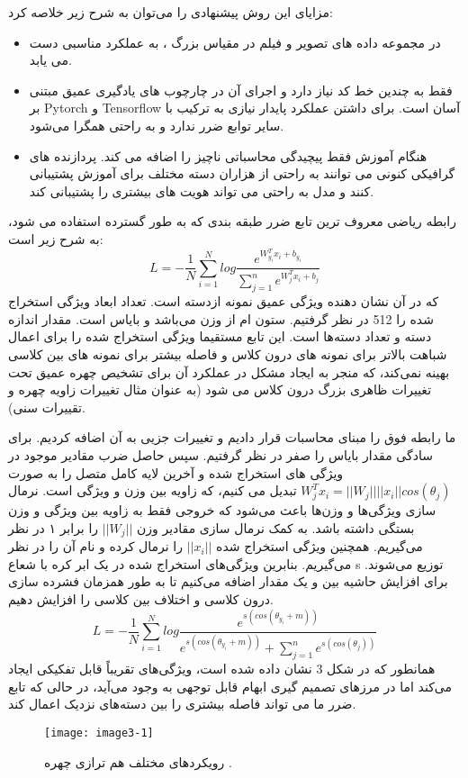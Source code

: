 مزایای این روش پیشنهادی را می‌توان به شرح زیر خلاصه کرد:
\begin{itemize}
 \item
در مجموعه داده های تصویر و فیلم در مقیاس بزرگ ، به عملکرد مناسبی دست می یابد.
 \item
فقط به چندین خط کد نیاز دارد و اجرای آن در چارچوب های یادگیری عمیق مبتنی بر  Pytorch و Tensorflow آسان است. برای داشتن عملکرد پایدار نیازی به ترکیب با سایر توابع ضرر ندارد و به راحتی همگرا می‌شود.
 \item
هنگام آموزش فقط پیچیدگی محاسباتی ناچیز را اضافه می کند. پردازنده های گرافیکی کنونی می توانند به راحتی از هزاران دسته مختلف برای آموزش پشتیبانی کنند و مدل به راحتی می تواند هویت های بیشتری را پشتیبانی کند.
\end{itemize} 
\noindent


رابطه ریاضی  معروف ترین تابع ضرر طبقه بندی که به طور گسترده استفاده می شود، به شرح زیر است:
 \begin{equation}\label{eq3-2}
L= - \frac{1}{N} \sum_{i=1}^{N} log \frac{e^{{W_{y_i}^T} x_i + b_{y_i}}}{\sum_{j=1}^{n} e^{{W_j^T} x_i + b_j}} 
\end{equation}
\noindent
که در آن  نشان دهنده ویژگی عمیق نمونه  ازدسته  است. تعداد ابعاد ویژگی استخراج شده را 512 در نظر گرفتیم.  ستون   ام از وزن  می‌باشد و  بایاس است. مقدار اندازه دسته و  تعداد دسته‌ها است. این تابع مستقیما ویژگی استخراج شده را برای اعمال شباهت بالاتر برای نمونه های درون کلاس و فاصله بیشتر برای نمونه های بین کلاسی بهینه نمی‌کند، که منجر به ایجاد مشکل در عملکرد آن برای تشخیص چهره عمیق تحت تغییرات ظاهری بزرگ درون کلاس می شود (به عنوان مثال تغییرات زاویه چهره و تقییرات سنی).

\noindent
ما رابطه فوق را مبنای محاسبات قرار دادیم و تغییرات جزیی به آن اضافه کردیم. برای سادگی مقدار بایاس را صفر در نظر گرفتیم. سپس حاصل ضرب مقادیر موجود در ویژگی های استخراج شده و آخرین لایه کامل
متصل را به صورت
$W_j^T x_i = ||W_j|| ||x_i|| cos(θ_j)$
تبدیل می کنیم، که  زاویه بین وزن  و ویژگی  است. نرمال سازی ویژگی‌ها و وزن‌ها باعث می‌شود که خروجی فقط به زاویه بین ویژگی و وزن بستگی داشته باشد. به کمک نرمال سازی مقادیر وزن $||W_j||$ را برابر ۱ در نظر می‌گیریم. همچنین ویژگی استخراج شده $||x_i||$ را نرمال کرده و نام آن را  در نظر می‌گیریم. ‌‌‌بنابرین ویژگی‌های استخراج شده در یک ابر کره با شعاع s توزیع می‌شوند. برای افزایش حاشیه بین  و  یک مقدار اضافه می‌کنیم تا به طور همزمان فشرده سازی درون کلاسی و اختلاف بین کلاسی را افزایش دهیم.
 \begin{equation}\label{eq3-2}
L = - \frac{1}{N} \sum_{i=1}^{N} log \frac{e^{s(cos(\theta_{y_i}+m))}}{e^{s(cos(\theta_{y_i}+m))} + \sum_{j=1}^{n} e^{s(cos(\theta_j))}}
\end{equation}
\noindent
همانطور که در شکل 3 نشان داده شده است،  ویژگی‌های تقریباً قابل تفکیکی ایجاد می‌کند اما در مرزهای تصمیم گیری ابهام قابل توجهی به وجود می‌آید، در حالی که تابع ضرر ما می تواند فاصله بیشتری را بین دسته‌های نزدیک اعمال کند.
\begin{figure}[h]
\centering
  \texttt{[image: image3-1]}
  \caption{رویکردهای مختلف هم ترازی چهره \cite{ref1}.}
  \label{image2-1}
\end{figure}

